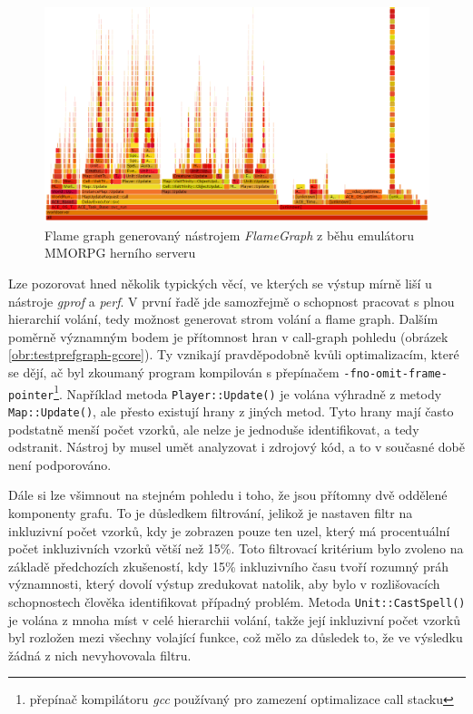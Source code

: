 \documentclass[czech,BP]{thesiskiv}
\begin{document}
\begin{figure}
    \centering
    \includegraphics[interpolate,width=1.0\textwidth]{img/test-gcore-brendan-flame.png}
    \caption{Flame graph generovaný nástrojem \emph{FlameGraph} z běhu emulátoru MMORPG herního serveru}
    \label{obr:testprefflamegregg-gcore}
\end{figure}

Lze pozorovat hned několik typických věcí, ve kterých se výstup mírně liší u nástroje \emph{gprof} a \emph{perf}. V první řadě jde samozřejmě o schopnost pracovat s plnou hierarchií volání, tedy možnost generovat strom volání a flame graph. Dalším poměrně významným bodem je přítomnost  hran v call-graph pohledu (obrázek \ref{obr:testprefgraph-gcore}). Ty vznikají pravděpodobně kvůli optimalizacím, které se dějí, ač byl zkoumaný program kompilován s přepínačem \texttt{-fno-omit-frame-pointer}\footnote{přepínač kompilátoru \emph{gcc} používaný pro zamezení optimalizace call stacku}. Například metoda \texttt{Player::Update()} je volána výhradně z metody \texttt{Map::Update()}, ale přesto existují hrany z jiných metod. Tyto hrany mají často podstatně menší počet vzorků, ale nelze je jednoduše identifikovat, a tedy odstranit. Nástroj by musel umět analyzovat i zdrojový kód, a to v současné době není podporováno.

Dále si lze všimnout na stejném pohledu i toho, že jsou přítomny dvě oddělené komponenty grafu. To je důsledkem filtrování, jelikož je nastaven filtr na inkluzivní počet vzorků, kdy je zobrazen pouze ten uzel, který má procentuální počet inkluzivních vzorků větší než 15\%. Toto filtrovací kritérium bylo zvoleno na základě předchozích zkušeností, kdy 15\% inkluzivního času tvoří rozumný práh významnosti, který dovolí výstup zredukovat natolik, aby bylo v rozlišovacích schopnostech člověka identifikovat případný problém. Metoda \texttt{Unit::CastSpell()} je volána z mnoha míst v celé hierarchii volání, takže její inkluzivní počet vzorků byl rozložen mezi všechny volající funkce, což mělo za důsledek to, že ve výsledku žádná z nich nevyhovovala filtru.
\end{document}

